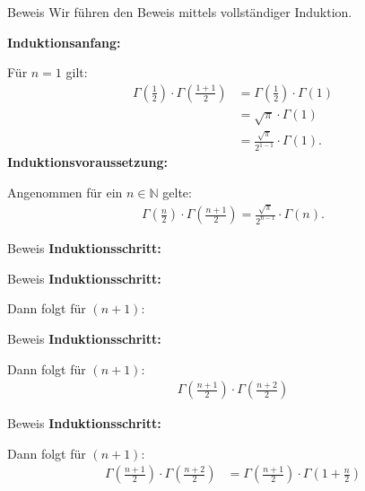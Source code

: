 \documentclass[10pt]{beamer}
\def\bN{\mathbb{N}}
\begin{document}
\begin{frame}{Beweis}
    Wir führen den Beweis mittels vollständiger Induktion.

    \textbf{Induktionsanfang:}

    Für \( n = 1 \) gilt:
    \begin{align*}
        \Gamma\left( \frac{1}{2} \right) \cdot \Gamma\left( \frac{1 + 1}{2} \right)
        & = \Gamma\left( \frac{1}{2} \right) \cdot \Gamma\left( 1 \right) \\
        & = \sqrt{\pi} \cdot \Gamma\left( 1 \right) \\
        & = \frac{\sqrt{\pi}}{2^{1 - 1}} \cdot \Gamma\left( 1 \right).
    \end{align*}
    \textbf{Induktionsvoraussetzung:}

    Angenommen für ein \( n \in \bN \) gelte:
    \begin{align*}
        \Gamma\left( \frac{n}{2} \right) \cdot \Gamma\left( \frac{n + 1}{2} \right) 
        = \frac{\sqrt{\pi}}{2^{n - 1}} \cdot \Gamma\left( n \right).
    \end{align*}
\end{frame}



\begin{frame}{Beweis}
    \textbf{Induktionsschritt:}
\end{frame}



\begin{frame}{Beweis}
    \textbf{Induktionsschritt:}

    Dann folgt für \( \left( n + 1 \right) \):
\end{frame}



\begin{frame}{Beweis}
    \textbf{Induktionsschritt:}

    Dann folgt für \( \left( n + 1 \right) \):
    \begin{align*}
        \Gamma\left( \frac{n + 1}{2} \right) \cdot \Gamma\left( \frac{n + 2}{2} \right)
    \end{align*}
\end{frame}



\begin{frame}{Beweis}
    \textbf{Induktionsschritt:}

    Dann folgt für \( \left( n + 1 \right) \):
    \begin{align*}
        \Gamma\left( \frac{n + 1}{2} \right) \cdot \Gamma\left( \frac{n + 2}{2} \right)
        & = \Gamma\left( \frac{n + 1}{2} \right) \cdot \Gamma\left( 1 + \frac{n}{2} \right)
    \end{align*}
\end{frame}
\end{document}
